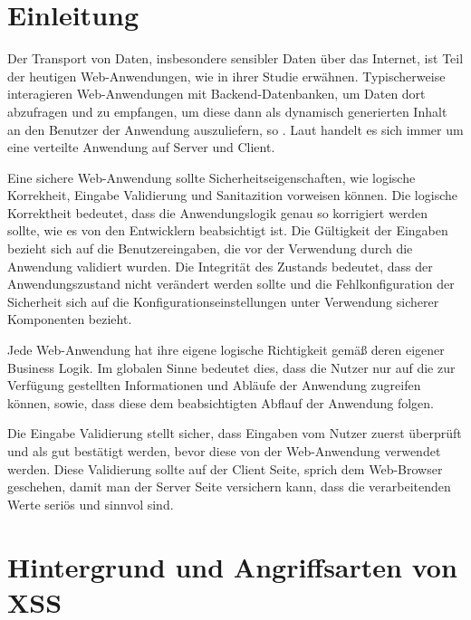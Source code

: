\section{Einleitung}
\label{section:Einleitung}

Der Transport von Daten, insbesondere sensibler Daten über das Internet, ist Teil der heutigen Web-Anwendungen, wie \textcite[1]{kirda2009} in ihrer Studie erwähnen. Typischerweise interagieren Web-Anwendungen mit Backend-Datenbanken, um Daten dort abzufragen und zu empfangen, um diese dann als dynamisch generierten Inhalt an den Benutzer der Anwendung auszuliefern, so \textcite[1]{su2006}. Laut \textcite[1857]{chaudhari2014} handelt es sich immer um eine verteilte Anwendung auf Server und Client.

Eine sichere Web-Anwendung sollte Sicherheitseigenschaften, wie logische Korrekheit, Eingabe Validierung und Sanitazition vorweisen können.
Die logische Korrektheit bedeutet, dass die Anwendungslogik genau so korrigiert werden sollte, wie es von den Entwicklern beabsichtigt ist.
Die Gültigkeit der Eingaben bezieht sich auf die Benutzereingaben, die vor der Verwendung  durch die Anwendung validiert wurden. Die Integrität des Zustands bedeutet, dass der Anwendungszustand nicht verändert werden sollte und die Fehlkonfiguration der Sicherheit sich auf die Konfigurationseinstellungen unter Verwendung sicherer Komponenten bezieht.\autocite[1857]{chaudhari2014}

Jede Web-Anwendung hat ihre eigene logische Richtigkeit gemäß deren eigener Business Logik. Im globalen Sinne bedeutet dies, dass die Nutzer nur auf die zur Verfügung gestellten Informationen und Abläufe der Anwendung zugreifen können, sowie, dass diese dem beabsichtigten Abflauf der Anwendung folgen.\autocite[1857]{chaudhari2014}

Die Eingabe Validierung stellt sicher, dass Eingaben vom Nutzer zuerst überprüft und als gut bestätigt werden, bevor diese von der Web-Anwendung verwendet werden. Diese Validierung sollte auf der Client Seite, sprich dem Web-Browser geschehen, damit man der Server Seite versichern kann, dass die verarbeitenden Werte seriös und sinnvol sind.\autocite[1857]{chaudhari2014}



\section{Hintergrund und Angriffsarten von XSS}
\label{section:Hintergrund}

